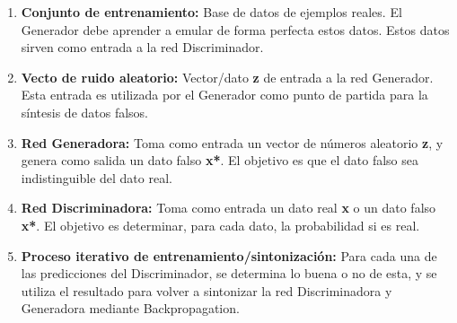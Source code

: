 \begin{enumerate}
    \item \textbf{Conjunto de entrenamiento:} Base de datos de ejemplos reales. El Generador debe aprender a emular de forma
                                              perfecta estos datos. Estos datos sirven como entrada a la red Discriminador.
    \item \textbf{Vecto de ruido aleatorio:} Vector/dato \textbf{z} de entrada a la red Generador. Esta entrada es utilizada
                                            por el Generador como punto de partida para la síntesis de datos falsos.
    \item \textbf{Red Generadora:} Toma como entrada un vector de números aleatorio \textbf{z}, y genera como salida un dato
                                    falso \textbf{x*}. El objetivo es que el dato falso sea indistinguible del dato real.
    \item \textbf{Red Discriminadora:} Toma como entrada un dato real \textbf{x} o un dato falso \textbf{x*}. El objetivo
                                        es determinar, para cada dato, la probabilidad si es real.
    \item \textbf{Proceso iterativo de entrenamiento/sintonización:} Para cada una de las predicciones del Discriminador,
                se determina lo buena o no de esta, y se utiliza el resultado para volver a sintonizar la red Discriminadora
                y Generadora mediante Backpropagation.
\end{enumerate}





\clearpage

